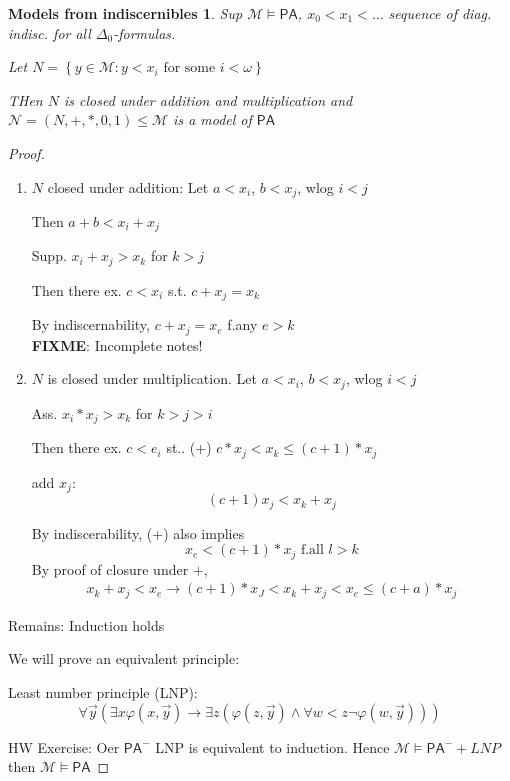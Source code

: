 \documentclass[12pt]{article}
\newcommand{\PA}{\ensuremath{\mathsf{PA}}}
\newcommand{\fixme}{\\ \textbf{FIXME}: Incomplete notes!}
\begin{document}
\newtheorem*{modelsi}{Models from indiscernibles}
\begin{modelsi}
  Sup $\mathcal{M} \models \PA$, $x_0 < x_1 < \dots$ sequence of diag. indisc.
  for all $\Delta_0$-formulas.

  Let $N = \left\{ y \in \mathcal{M} : y < x_i \text{ for some } i < \omega \right\}$

  THen $N$ is closed under addition and multiplication
  and $\mathcal{N} = (N, +, *, 0, 1) \le \mathcal{M}$ is a model of $\PA$
\end{modelsi}
\begin{proof}
\begin{enumerate}[(1)]
  \item $N$ closed under addition:
    Let $a < x_i$, $b < x_j$, wlog $i < j$

    Then $a + b < x_i + x_j$

    Supp. $x_i + x_j > x_k$ for $k > j$

    Then there ex. $c < x_i$ s.t. $c + x_j = x_k$

    By indiscernability, $c+x_j = x_e$ f.any $e > k$
    \fixme %

  \item $N$ is closed under multiplication.
    Let $a < x_i$, $b < x_j$, wlog $i < j$

    Ass. $x_i * x_j > x_k$ for $k > j > i$

    Then there ex. $c < e_i$ st..
    (+) $c * x_j < x_k \le (c+1) * x_j$

    add $x_j$:
    \[
(c+1) x_j < x_k + x_j
    \]

    By indiscerability, (+) also implies
    \[
    x_e < (c+1)* x_j \text{  f.all } l > k
    \]
    By proof of closure under $+$,
    \begin{align*}
x_k + x_j < x_e
\rightarrow (c +1) * x_J < x_k + x_j < x_e \le (c+a) * x_j
    \end{align*}
\end{enumerate}
Remains: Induction holds

We will prove an equivalent principle:

Least number principle (LNP):
\[
\forall \vec{y} \left( \exists x \varphi(x, \vec{y}) \rightarrow
\exists z (\varphi(z, \vec{y}) \wedge \forall w < z \neg \varphi(w, \vec{y}))\right)
\]

HW Exercise:
Oer $\PA^-$ LNP is equivalent to induction.
Hence $\mathcal{M} \models \PA^- + LNP$ then $\mathcal{M} \models \PA$
\end{proof}
\end{document}

